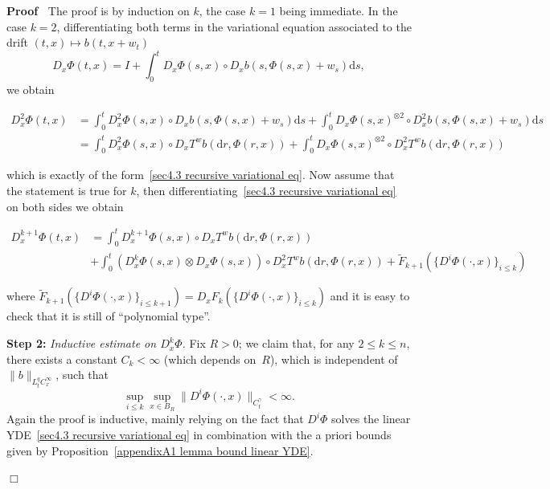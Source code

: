 \documentclass[10pt]{article}
\newcommand{\mathd}{\mathrm{d}}
\newcommand{\nobracket}{}
\newcommand{\tmstrong}[1]{\textbf{#1}}
\newcommand{\tmtextit}[1]{{\itshape{#1}}}
\newenvironment{proof}{\noindent\textbf{Proof\ }}{\hspace*{\fill}$\Box$\medskip}
\begin{document}
\begin{proof}
  The proof is by induction on $k$, the case $k = 1$ being immediate. In the
  case $k = 2$, differentiating both terms in the variational equation
  associated to the drift $(t, x) \mapsto b (t, x + w_t)$
  \[ D_x \Phi (t, x) = I + \int_0^t D_x \Phi (s, x) \circ D_x b (s, \Phi (s,
     x) + w_s) \mathd s, \]
  we obtain
  
  \begin{align*}
    D_x^2 \Phi (t, x) & = \int_0^t D_x^2 \Phi (s, x) \circ D_x b (s, \Phi (s,
    x) + w_s) \mathd s + \int_0^t D_x \Phi (s, x)^{\otimes 2} \circ D_x^2 b
    (s, \Phi (s, x) + w_s) \mathd s\\
    & = \int_0^t D_x^2 \Phi (s, x) \circ \nobracket D_x T^w b (\mathd r, \Phi
    (r, x) \nobracket) + \int_0^t D_x \Phi (s, x)^{\otimes 2} \circ \nobracket
    D_x^2 T^w b (\mathd r, \Phi (r, x) \nobracket)
  \end{align*}
  
  which is exactly of the form~{\eqref{sec4.3 recursive variational eq}}. Now
  assume that the statement is true for $k$, then
  differentiating~{\eqref{sec4.3 recursive variational eq}} on both sides we
  obtain
  
  \begin{align*}
    D_x^{k + 1} \Phi (t, x) & = \int_0^t D_x^{k + 1} \Phi (s, x) \circ
    \nobracket D_x T^w b (\mathd r, \Phi (r, x) \nobracket)\\
    & + \int_0^t (D_x^k \Phi (s, x) \otimes D_x \Phi (s, x)) \circ \nobracket
    D_x^2 T^w b (\mathd r, \Phi (r, x) \nobracket) + \tilde{F}_{k + 1} (\{ D^i
    \Phi (\cdot, x) \}_{i \leqslant k})
  \end{align*}
  
  where $\tilde{F}_{k + 1} (\{ D^i \Phi (\cdot, x) \}_{i \leqslant k + 1}) =
  D_x F_k (\{ D^i \Phi (\cdot, x) \}_{i \leqslant k})$ and it is easy to check
  that it is still of ``polynomial type''.
  
  {\tmstrong{Step 2:}} \tmtextit{Inductive estimate on $D^k_x \Phi$.} Fix $R >
  0$; we claim that, for any $2 \leqslant k \leqslant n$, there exists a
  constant $C_k < \infty$ (which depends on~$R$), which is independent of $\|
  b \|_{L^q_t C^{\infty}_x}$, such that
  \[ \sup_{i \leqslant k} \sup_{x \in B_R}  \| D^i \Phi (\cdot, x)
     \|_{C^{\gamma}_t} < \infty . \]
  Again the proof is inductive, mainly relying on the fact that $D^i \Phi$
  solves the linear YDE~{\eqref{sec4.3 recursive variational eq}} in
  combination with the a priori bounds given by Proposition~\ref{appendixA1
  lemma bound linear YDE}.
  

\end{proof}
\end{document}
